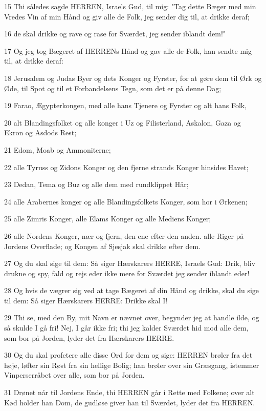 \par 15 Thi således sagde HERREN, Israels Gud, til mig: "Tag dette Bæger med min Vredes Vin af min Hånd og giv alle de Folk, jeg sender dig til, at drikke deraf;
\par 16 de skal drikke og rave og rase for Sværdet, jeg sender iblandt dem!"
\par 17 Og jeg tog Bægeret af HERRENs Hånd og gav alle de Folk, han sendte mig til, at drikke deraf:
\par 18 Jerusalem og Judas Byer og dets Konger og Fyrster, for at gøre dem til Ørk og Øde, til Spot og til et Forbandelsens Tegn, som det er på denne Dag;
\par 19 Farao, Ægypterkongen, med alle hans Tjenere og Fyrster og alt hans Folk,
\par 20 alt Blandingsfolket og alle konger i Uz og Filisterland, Askalon, Gaza og Ekron og Asdods Rest;
\par 21 Edom, Moab og Ammoniterne;
\par 22 alle Tyruss og Zidons Konger og den fjerne strands Konger hinsides Havet;
\par 23 Dedan, Tema og Buz og alle dem med rundklippet Hår;
\par 24 alle Arabernes konger og alle Blandingsfolkets Konger, som hor i Ørkenen;
\par 25 alle Zimris Konger, alle Elams Konger og alle Mediens Konger;
\par 26 alle Nordens Konger, nær og fjern, den ene efter den anden. alle Riger på Jordens Overflade; og Kongen af Sjesjak skal drikke efter dem.
\par 27 Og du skal sige til dem: Så siger Hærskarers HERRE, Israels Gud: Drik, bliv drukne og spy, fald og rejs eder ikke mere for Sværdet jeg sender iblandt eder!
\par 28 Og hvis de vægrer sig ved at tage Bægeret af din Hånd og drikke, skal du sige til dem: Så siger Hærskarers HERRE: Drikke skal I!
\par 29 Thi se, med den By, mit Navn er nævnet over, begynder jeg at handle ilde, og så skulde I gå fri! Nej, I går ikke fri; thi jeg kalder Sværdet hid mod alle dem, som bor på Jorden, lyder det fra Hærskarers HERRE.
\par 30 Og du skal profetere alle disse Ord for dem og sige: HERREN brøler fra det høje, løfter sin Røst fra sin hellige Bolig; han brøler over sin Græsgang, istemmer Vinperserråbet over alle, som bor på Jorden.
\par 31 Drønet når til Jordens Ende, thi HERREN går i Rette med Folkene; over alt Kød holder han Dom, de gudløse giver han til Sværdet, lyder det fra HERREN.
